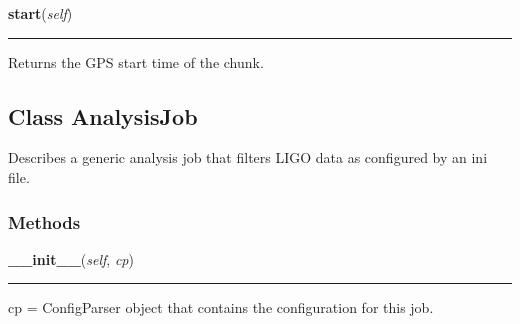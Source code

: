     \label{pipeline:AnalysisChunk:start}
    \vspace{0.5ex}

    \noindent\begin{boxedminipage}{\textwidth}

    \raggedright \textbf{start}(\textit{self})

    \vspace{-1.5ex}

    \rule{\textwidth}{0.5\fboxrule}
    Returns the GPS start time of the chunk.

    \vspace{1ex}

    \end{boxedminipage}



\subsection{Class AnalysisJob}

    \label{pipeline:AnalysisJob}
Describes a generic analysis job that filters LIGO data as configured by 
an ini file.



  \subsubsection{Methods}

    \label{pipeline:AnalysisJob:__init__}
    \vspace{0.5ex}

    \noindent\begin{boxedminipage}{\textwidth}

    \raggedright \textbf{\_\_init\_\_}(\textit{self}, \textit{cp})

    \vspace{-1.5ex}

    \rule{\textwidth}{0.5\fboxrule}
    cp = ConfigParser object that contains the configuration for this 
    job.

    \vspace{1ex}

    \end{boxedminipage}

